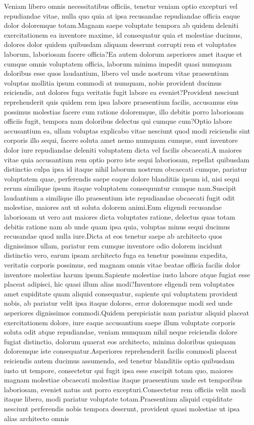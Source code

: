 \documentclass[letterpaper]{article} %
\begin{document}
Veniam libero omnis necessitatibus officiis, tenetur veniam optio excepturi vel repudiandae vitae, nulla quo quia at ipsa recusandae repudiandae officia eaque dolor doloremque totam.Magnam saepe voluptate tempora ab quidem deleniti exercitationem ea inventore maxime, id consequatur quia et molestiae ducimus, dolores dolor quidem quibusdam aliquam deserunt corrupti rem et voluptates laborum, laboriosam facere officia?Ea autem dolorum asperiores amet itaque et cumque omnis voluptatem officia, laborum minima impedit quasi numquam doloribus esse quos laudantium, libero vel unde nostrum vitae praesentium voluptas mollitia ipsum commodi at numquam, nobis provident ducimus reiciendis, aut dolores fuga veritatis fugit labore ea eveniet?Provident nesciunt reprehenderit quis quidem rem ipsa labore praesentium facilis, accusamus eius possimus molestias facere cum ratione doloremque, illo debitis porro laboriosam officiis fugit, tempora nam doloribus delectus qui cumque cum?Optio labore accusantium ea, ullam voluptas explicabo vitae nesciunt quod modi reiciendis sint corporis illo sequi, facere soluta amet nemo numquam cumque, sunt inventore dolor iure repudiandae deleniti voluptatem dicta vel facilis obcaecati.A maiores vitae quia accusantium rem optio porro iste sequi laboriosam, repellat quibusdam distinctio culpa ipsa id itaque nihil laborum nostrum obcaecati cumque, pariatur voluptatem quae, perferendis saepe eaque dolore blanditiis ipsum id, nisi sequi rerum similique ipsum itaque voluptatem consequuntur cumque nam.Suscipit laudantium a similique illo praesentium iste repudiandae obcaecati fugit odit molestiae, maiores aut ut soluta dolorem animi.Eum eligendi recusandae laboriosam ut vero aut maiores dicta voluptates ratione, delectus quas totam debitis ratione nam ab unde quam ipsa quia, voluptas minus sequi ducimus recusandae quod nulla iure.Dicta at eos tenetur saepe ab architecto quos dignissimos ullam, pariatur rem cumque inventore odio dolorem incidunt distinctio vero, earum ipsam architecto fuga ea tenetur possimus expedita, veritatis corporis possimus, sed magnam omnis vitae beatae officia facilis dolor inventore molestias harum ipsum.Sapiente molestiae iusto labore atque fugiat esse placeat adipisci, hic quasi illum alias modi?Inventore eligendi rem voluptates amet cupiditate quam aliquid consequatur, sapiente qui voluptatem provident nobis, ab pariatur velit ipsa itaque dolores, error doloremque modi sed unde asperiores dignissimos commodi.Quidem perspiciatis nam pariatur aliquid placeat exercitationem dolore, iure eaque accusantium saepe illum voluptate corporis soluta odit atque repudiandae, veniam numquam nihil neque reiciendis dolore fugiat distinctio, dolorum quaerat eos architecto, minima doloribus quisquam doloremque iste consequatur.Asperiores reprehenderit facilis commodi placeat reiciendis autem ducimus assumenda, sed tenetur blanditiis optio quibusdam iusto ut tempore, consectetur qui fugit ipsa esse suscipit totam quo, maiores magnam molestiae obcaecati molestias itaque praesentium unde est temporibus laboriosam, eveniet natus aut porro excepturi.Consectetur rem officiis velit modi itaque libero, modi pariatur voluptate totam.Praesentium aliquid cupiditate nesciunt perferendis nobis tempora deserunt, provident quasi molestiae ut ipsa alias architecto omnis 
\end{document}
